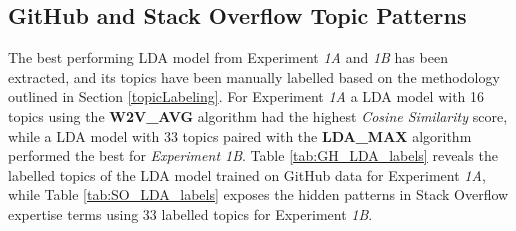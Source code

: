         \begin{table}
          \centering
          \caption{Results of Experiment 2B - Expertise Extraction from Stack Overflow Data} \label{tab:SO_results2}
            \vspace{6pt} %
        \end{table}
        
        \subsection{GitHub and Stack Overflow Topic Patterns}
        
            The best performing LDA model from Experiment \emph{1A} and \emph{1B} has been extracted, and its topics have been manually labelled based on the methodology outlined in Section \ref{topicLabeling}. For Experiment \emph{1A} a LDA model with 16 topics using the \textbf{W2V\_AVG} algorithm had the highest \emph{Cosine Similarity} score, while a LDA model with 33 topics paired with the \textbf{LDA\_MAX} algorithm performed the best for \emph{Experiment 1B}. Table \ref{tab:GH_LDA_labels} reveals the labelled topics of the LDA model trained on GitHub data for Experiment \emph{1A}, while Table \ref{tab:SO_LDA_labels} exposes the hidden patterns in Stack Overflow expertise terms using 33 labelled topics for Experiment \emph{1B}.
     
